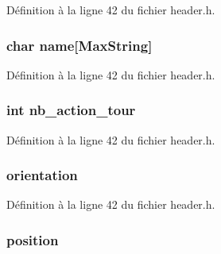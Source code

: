 Définition à la ligne 42 du fichier header.\-h.

\hypertarget{structt__character_ab27f28c5ead39031421706ddbbd1edea}{
\subsubsection[{name}]{\setlength{\rightskip}{0pt plus 5cm}char name\mbox{[}{\bf Max\-String}\mbox{]}}}\label{structt__character_ab27f28c5ead39031421706ddbbd1edea}


Définition à la ligne 42 du fichier header.\-h.

\hypertarget{structt__character_aaff424b51f4bd3db2c199cc08f21f86d}{
\subsubsection[{nb\-\_\-action\-\_\-tour}]{\setlength{\rightskip}{0pt plus 5cm}int nb\-\_\-action\-\_\-tour}}\label{structt__character_aaff424b51f4bd3db2c199cc08f21f86d}


Définition à la ligne 42 du fichier header.\-h.

\hypertarget{structt__character_af778044107ad1a59b9725fa3962560ad}{
\subsubsection[{orientation}]{ orientation}}\label{structt__character_af778044107ad1a59b9725fa3962560ad}


Définition à la ligne 42 du fichier header.\-h.

\hypertarget{structt__character_a27c93348dcaa3ea78282fb5ef6ce371b}{
\subsubsection[{position}]{ position}}\label{structt__character_a27c93348dcaa3ea78282fb5ef6ce371b}


